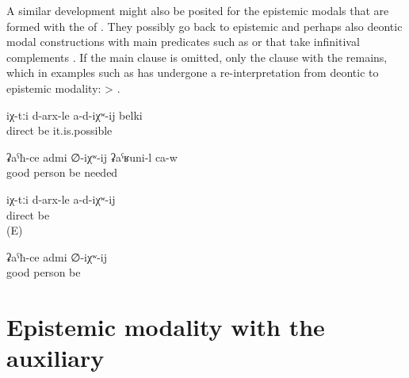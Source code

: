 A similar development might also be posited for the epistemic modals that are formed with the  of . They possibly go back to epistemic and perhaps also deontic modal constructions with main predicates such as   or   that take infinitival complements . If the main clause is omitted, only the clause with the  remains, which in examples such as  has undergone a re-interpretation from deontic to epistemic modality:   >  .

\begin{exe}
	\ex	\label{ex:Maybe they (= my thoughts) are not right}
	\gll	iχ-tːi	d-arx-le	a-d-iχʷ-ij	belki\\
			direct	be	it.is.possible\\
	\glt	{}

	\ex	\label{ex:He must be a good man / He should be a good man}
	\gll	ʡaˁħ-ce	admi	∅-iχʷ-ij	ʡaˁʁuni-l	ca-w\\
		good	person	be	needed	\\
	\glt	{}

	\ex	\label{ex:They (= my thoughts) are probably not right}
	\gll	iχ-tːi	d-arx-le	a-d-iχʷ-ij\\
			direct	be\\
	\glt	{} (E)

	\ex	\label{ex:He is probably a good man}
	\gll	ʡaˁħ-ce	admi	∅-iχʷ-ij\\
		good	person	be\\
	\glt	{}
\end{exe}



\section{Epistemic modality with the auxiliary \protect{} \protect{}}
\label{sec:Epistemic modality with the auxiliary b-urk find}

